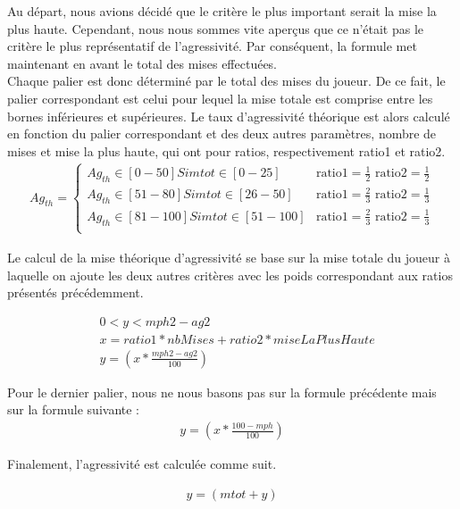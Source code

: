 \documentclass{report}
\begin{document}
Au départ, nous avions décidé que le critère le plus important serait la mise la plus haute. Cependant, nous nous sommes vite aperçus que ce n'était pas le critère le plus représentatif de l'agressivité. Par conséquent, la formule met maintenant en avant le total des mises effectuées.\\

Chaque palier est donc déterminé par le total des mises du joueur. De ce fait, le palier correspondant est celui pour lequel la mise totale est comprise entre les bornes inférieures et supérieures. Le taux d'agressivité théorique est alors calculé en fonction du palier correspondant et des deux autres paramètres, nombre de mises et mise la plus haute, qui ont pour ratios, respectivement ratio1 et ratio2. \\

\small{
\begin{align*}
	Ag_{th}=
	\begin{cases}
		Ag_{th} \in [0-50] Si mtot \in [0-25] &\text{ratio1}=\frac{1}{2} \text{ ratio2}=\frac{1}{2} \\
		Ag_{th} \in [51-80] Si mtot \in [26-50] &\text{ratio1}=\frac{2}{3} \text{ ratio2}=\frac{1}{3} \\
		Ag_{th} \in [81-100] Si mtot \in [51-100]  &\text{ratio1}=\frac{2}{3} \text{ ratio2}=\frac{1}{3}\\
	\end{cases}
\end{align*}
}


Le calcul de la mise théorique d'agressivité se base sur la mise totale du joueur à laquelle on ajoute les deux autres critères avec les poids correspondant aux ratios présentés précédemment. \par
\begin{align*}
	&0<y<mph2-ag2\\
	&x=ratio1 * nbMises + ratio2 * miseLaPlusHaute\\
	&y=\left(x*\frac{mph2-ag2}{100}\right)
\end{align*}


Pour le dernier palier, nous ne nous basons pas sur la formule précédente mais sur la formule suivante :\\ 

\begin{align*}
	y=\left(x*\frac{100-mph}{100}\right)
\end{align*}

Finalement, l'agressivité est calculée comme suit. 

\begin{align*}
	y=\left(mtot + y\right)
\end{align*}
\end{document}
